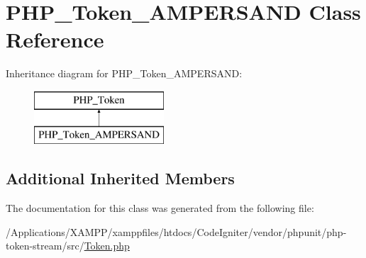 \hypertarget{class_p_h_p___token___a_m_p_e_r_s_a_n_d}{}\section{P\+H\+P\+\_\+\+Token\+\_\+\+A\+M\+P\+E\+R\+S\+A\+ND Class Reference}
\label{class_p_h_p___token___a_m_p_e_r_s_a_n_d}
Inheritance diagram for P\+H\+P\+\_\+\+Token\+\_\+\+A\+M\+P\+E\+R\+S\+A\+ND\+:\begin{figure}[H]
\begin{center}
\leavevmode
\includegraphics[height=2.000000cm]{class_p_h_p___token___a_m_p_e_r_s_a_n_d}
\end{center}
\end{figure}
\subsection*{Additional Inherited Members}


The documentation for this class was generated from the following file\+:\begin{DoxyCompactItemize}
\item 
/\+Applications/\+X\+A\+M\+P\+P/xamppfiles/htdocs/\+Code\+Igniter/vendor/phpunit/php-\/token-\/stream/src/\mbox{\hyperlink{_token_8php}{Token.\+php}}\end{DoxyCompactItemize}
